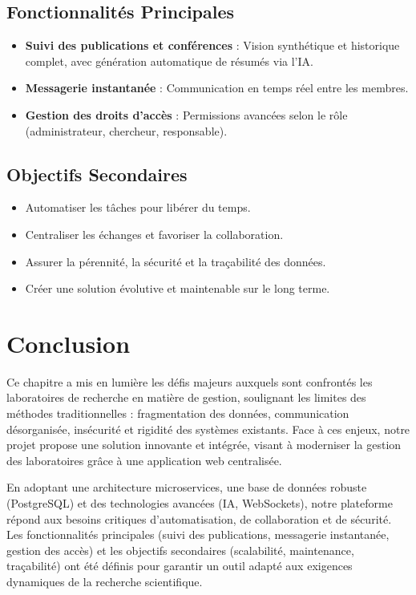 \documentclass{rapportPfe}
\begin{document}
\subsection{Fonctionnalités Principales}
\begin{itemize}
  \item \textbf{Suivi des publications et conférences} : Vision synthétique et historique complet, avec génération automatique de résumés via l’IA.
  \item \textbf{Messagerie instantanée} : Communication en temps réel entre les membres.
  \item \textbf{Gestion des droits d’accès} : Permissions avancées selon le rôle (administrateur, chercheur, responsable).
\end{itemize}

\subsection{Objectifs Secondaires}
\begin{itemize}
  \item Automatiser les tâches pour libérer du temps.
  \item Centraliser les échanges et favoriser la collaboration.
  \item Assurer la pérennité, la sécurité et la traçabilité des données.
  \item Créer une solution évolutive et maintenable sur le long terme.
\end{itemize}

\section{Conclusion}
Ce chapitre a mis en lumière les défis majeurs auxquels sont confrontés les laboratoires de recherche en matière de gestion, soulignant les limites des méthodes traditionnelles : fragmentation des données, communication désorganisée, insécurité et rigidité des systèmes existants. Face à ces enjeux, notre projet propose une solution innovante et intégrée, visant à moderniser la gestion des laboratoires grâce à une application web centralisée.

En adoptant une architecture microservices, une base de données robuste (PostgreSQL) et des technologies avancées (IA, WebSockets), notre plateforme répond aux besoins critiques d’automatisation, de collaboration et de sécurité. Les fonctionnalités principales (suivi des publications, messagerie instantanée, gestion des accès) et les objectifs secondaires (scalabilité, maintenance, traçabilité) ont été définis pour garantir un outil adapté aux exigences dynamiques de la recherche scientifique.
\end{document}

